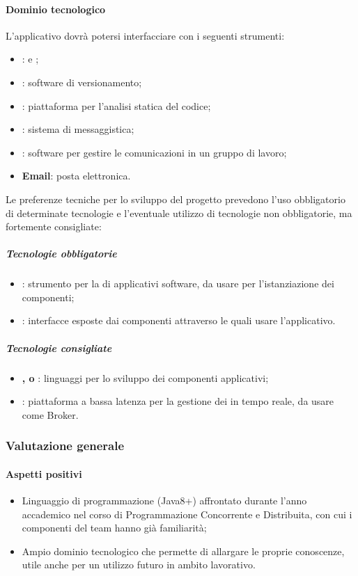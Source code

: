 	\paragraph{Dominio tecnologico} \Spazio
	L'applicativo dovrà potersi interfacciare con i seguenti strumenti:
	\begin{itemize}
		\item  \textbf{}:  e ;
		\item  \textbf{}: software di versionamento;
		\item  \textbf{}: piattaforma per l'analisi statica del codice;
		\item  \textbf{}: sistema di messaggistica;
		\item  \textbf{}: software per gestire le comunicazioni in un gruppo di lavoro;
		\item  \textbf{Email}: posta elettronica.
		
	\end{itemize}
	
	Le preferenze tecniche per lo sviluppo del progetto prevedono l'uso obbligatorio di determinate tecnologie e l'eventuale utilizzo di tecnologie non obbligatorie, ma fortemente consigliate:
	\subparagraph{Tecnologie obbligatorie}
	\begin{itemize}
		\item  \textbf{}: strumento per la  di applicativi software, da usare per l'istanziazione dei componenti;
		\item  \textbf{}: interfacce esposte dai componenti attraverso le quali usare l'applicativo.
	\end{itemize}
	\subparagraph{Tecnologie consigliate}
	\begin{itemize}
		\item \textbf{,  o }: linguaggi per lo sviluppo dei componenti applicativi;  
		\item  \textbf{}: piattaforma a bassa latenza per la gestione dei  in tempo reale, da usare come Broker.
	\end{itemize}
	\subsubsection{Valutazione generale}
	\paragraph{Aspetti positivi} 
	\begin{itemize}
		\item {Linguaggio di programmazione (Java8+) affrontato durante l'anno accademico nel corso di Programmazione Concorrente e Distribuita, con cui i componenti del team hanno già familiarità;}
		\item{Ampio dominio tecnologico che permette di allargare le proprie conoscenze, utile anche per un utilizzo futuro in ambito lavorativo.}
	\end{itemize}

